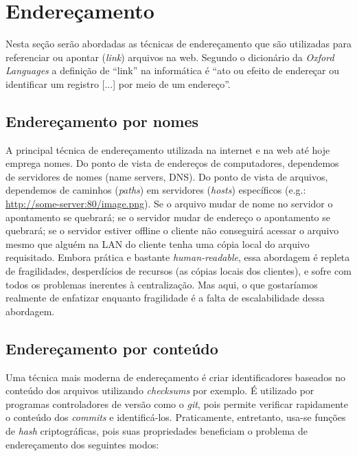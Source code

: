 \section{Endereçamento}

Nesta seção serão abordadas as técnicas de endereçamento que são utilizadas para referenciar ou apontar (\textit{link}) arquivos na web.
Segundo o dicionário da \textit{Oxford Languages} a definição de ``link'' na informática é ``ato ou efeito de endereçar ou identificar um registro [...] por meio de um endereço''.

\subsection{Endereçamento por nomes}

A principal técnica de endereçamento utilizada na internet e na web até hoje emprega nomes.
Do ponto de vista de endereços de computadores, dependemos de servidores de nomes (name servers, DNS).
Do ponto de vista de arquivos, dependemos de caminhos (\textit{paths}) em servidores (\textit{hosts}) específicos (e.g.: \url{http://some-server:80/image.png}).
Se o arquivo mudar de nome no servidor o apontamento se quebrará; se o servidor mudar de endereço o apontamento se quebrará; se o servidor estiver offline o cliente não conseguirá acessar o arquivo mesmo que alguém na LAN do cliente tenha uma cópia local do arquivo requisitado.
Embora prática e bastante \textit{human-readable}, essa abordagem é repleta de fragilidades, desperdícios de recursos (as cópias locais dos clientes), e sofre com todos os problemas inerentes à centralização.
Mas aqui, o que gostaríamos realmente de enfatizar enquanto fragilidade é a falta de escalabilidade dessa abordagem.

\subsection{Endereçamento por conteúdo}

Uma técnica mais moderna de endereçamento é criar identificadores baseados no conteúdo dos arquivos utilizando \textit{checksums} por exemplo.
É utilizado por programas controladores de versão como o \textit{git}, pois permite verificar rapidamente o conteúdo dos \textit{commits} e identificá-los.
Praticamente, entretanto, usa-se funções de \textit{hash} criptográficas, pois suas propriedades beneficiam o problema de endereçamento dos seguintes modos:

